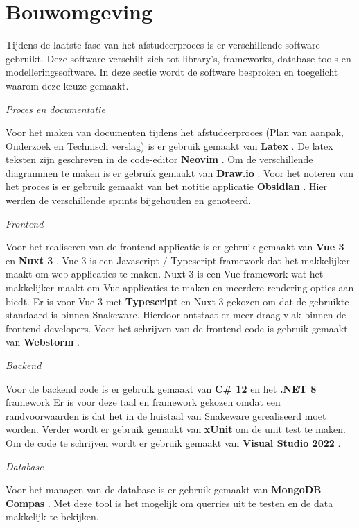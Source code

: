 \section{Bouwomgeving}
Tijdens de laatste fase van het afstudeerproces is er verschillende software gebruikt.
Deze software verschilt zich tot library's, frameworks, database tools en modelleringssoftware.
In deze sectie wordt de software besproken en toegelicht waarom deze keuze gemaakt.

\whitespace[2]
\textit{Proces en documentatie}

\whitespace[2]
Voor het maken van documenten tijdens het afstudeerproces (Plan van aanpak, Onderzoek en Technisch verslag) is er gebruik gemaakt van \textbf{Latex} \parencite{Latex}.
De latex teksten zijn geschreven in de code-editor \textbf{Neovim} \parencite{NeoVim}.
Om de verschillende diagrammen te maken is er gebruik gemaakt van \textbf{Draw.io} \parencite{Drawio}.
Voor het noteren van het proces is er gebruik gemaakt van het notitie applicatie \textbf{Obsidian} \parencite{Obsidian}.
Hier werden de verschillende sprints bijgehouden en genoteerd.

\whitespace[2]
\textit{Frontend}

\whitespace[2]
Voor het realiseren van de frontend applicatie is er gebruik gemaakt van \textbf{Vue 3} \parencite{Vue} en \textbf{Nuxt 3} \parencite{Nuxt}.
Vue 3 is een Javascript \parencite{JavaScript} / Typescript \parencite{Typescript} framework dat het makkelijker maakt om web applicaties te maken.
Nuxt 3 is een Vue framework wat het makkelijker maakt om Vue applicaties te maken en meerdere rendering opties aan biedt.
Er is voor Vue 3 met \textbf{Typescript} en Nuxt 3 gekozen om dat de gebruikte standaard is binnen Snakeware.
Hierdoor ontstaat er meer draag vlak binnen de frontend developers.
Voor het schrijven van de frontend code is gebruik gemaakt van \textbf{Webstorm} \parencite{Webstorm}.

\whitespace[2]
\textit{Backend}

\whitespace[2]
Voor de backend code is er gebruik gemaakt van \textbf{C\# 12} \parencite{CSharp} en het \textbf{.NET 8} framework \parencite{DotNet8}
Er is voor deze taal en framework gekozen omdat een  randvoorwaarden is dat het in de huistaal van Snakeware gerealiseerd moet worden.
Verder wordt er gebruik gemaakt van \textbf{xUnit} \parencite{xUnit} om de unit test te maken.
Om de code te schrijven wordt er gebruik gemaakt van \textbf{Visual Studio 2022} \parencite{VisualStudio}.

\whitespace[2]
\textit{Database}

\whitespace[2]
Voor het managen van de database is er gebruik gemaakt van \textbf{MongoDB Compas} \parencite{MongoDBCompas}.
Met deze tool is het mogelijk om querries uit te testen en de data makkelijk te bekijken.
%
% 
% 
